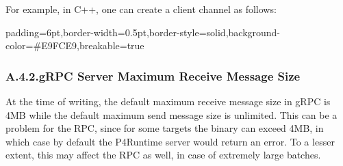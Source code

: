 \documentclass[11pt]{article}
\begin{document}
{%
For example, in C++, one can create a client channel as follows:%

\begin{mdbmargintb}{6pt}{6pt}%
\begin{mdblock}{padding=6pt,border-width=0.5pt,border-style=solid,background-color=\#E9FCE9,breakable=true}%
\begin{mdpre}%
\end{mdpre}%
\end{mdblock}%
\end{mdbmargintb}%

\subsubsection{A.4.2.\hspace*{0.5em}gRPC Server Maximum Receive Message Size}\label{sec-grpc-server-maximum-receive-message-size}%

\noindent{}At the time of writing, the default maximum receive message size in gRPC is 4MB
\textemdash{} while the default maximum send message size is unlimited. This can be a
problem for the  RPC, since for some targets the
binary  can exceed 4MB, in which case by default the P4Runtime
server would return an  error. To a lesser extent, this may
affect the  RPC as well, in case of extremely large batches.%

}
\end{document}
